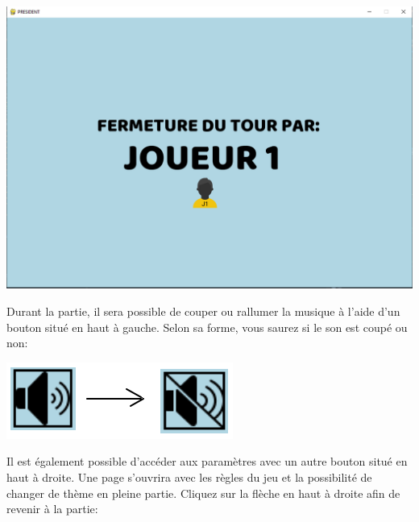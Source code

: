 \documentclass[french,12pt]{article}
\begin{document}
\begin{center}
	\includegraphics[scale=0.3]{img/fermeture.png}
\end{center}

Durant la partie, il sera possible de couper ou rallumer la musique à l'aide d'un bouton situé en haut à gauche. Selon sa forme, vous saurez si le son est coupé ou non:

\begin{center}
	\includegraphics[scale=0.8]{img/son.png}
\end{center}

Il est également possible d'accéder aux paramètres avec un autre bouton situé en haut à droite. Une page s'ouvrira avec les règles du jeu et la possibilité de changer de thème en pleine partie. Cliquez sur la flèche en haut à droite afin de revenir à la partie:
\end{document}
